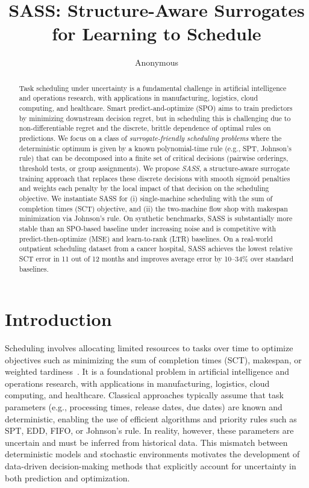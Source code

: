 \documentclass{article}
\title{SASS: Structure-Aware Surrogates for Learning to Schedule}
\author{Anonymous}
\begin{document}
\maketitle

\begin{abstract}
Task scheduling under uncertainty is a fundamental challenge in artificial intelligence and operations research, with applications in manufacturing, logistics, cloud computing, and healthcare.
Smart predict-and-optimize (SPO) aims to train predictors by minimizing downstream decision regret, but in scheduling this is challenging due to non-differentiable regret and the discrete, brittle dependence of optimal rules on predictions.
We focus on a class of \emph{surrogate-friendly scheduling problems} where the deterministic optimum is given by a known polynomial-time rule (e.g., SPT, Johnson's rule) that can be decomposed into a finite set of critical decisions (pairwise orderings, threshold tests, or group assignments).
We propose \emph{SASS}, a structure-aware surrogate training approach that replaces these discrete decisions with smooth sigmoid penalties and weights each penalty by the local impact of that decision on the scheduling objective.
We instantiate SASS for (i) single-machine scheduling with the sum of completion times (SCT) objective, and (ii) the two-machine flow shop with makespan minimization via Johnson's rule.
On synthetic benchmarks, SASS is substantially more stable than an SPO-based baseline under increasing noise and is competitive with predict-then-optimize (MSE) and learn-to-rank (LTR) baselines.
On a real-world outpatient scheduling dataset from a cancer hospital, SASS achieves the lowest relative SCT error in 11 out of 12 months and improves average error by 10--34\% over standard baselines.
\end{abstract}

\section{Introduction}
\label{sec:introduction}

Scheduling involves allocating limited resources to tasks over time to optimize objectives such as minimizing the sum of completion times (SCT), makespan, or weighted tardiness~\cite{baker2018principles,pinedo2022scheduling}.
It is a foundational problem in artificial intelligence and operations research, with applications in manufacturing, logistics, cloud computing, and healthcare.
Classical approaches typically assume that task parameters (e.g., processing times, release dates, due dates) are known and deterministic, enabling the use of efficient algorithms and priority rules such as SPT, EDD, FIFO, or Johnson's rule.
In reality, however, these parameters are uncertain and must be inferred from historical data.
This mismatch between deterministic models and stochastic environments motivates the development of data-driven decision-making methods that explicitly account for uncertainty in both prediction and optimization.
\end{document}
